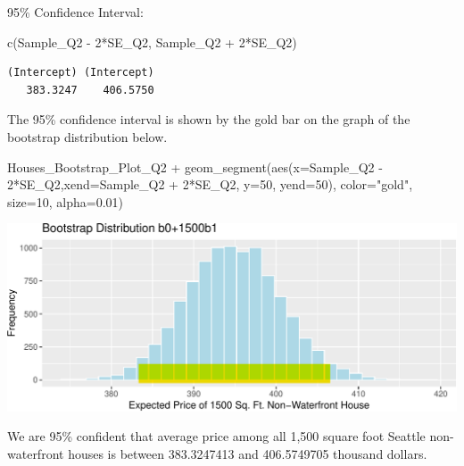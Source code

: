 \documentclass[
  letterpaper,
  DIV=11,
  numbers=noendperiod]{scrreprt}
\newenvironment{Shaded}{\begin{snugshade}}{\end{snugshade}}
\newcommand{\AttributeTok}[1]{\textcolor[rgb]{0.40,0.45,0.13}{#1}}
\newcommand{\DecValTok}[1]{\textcolor[rgb]{0.68,0.00,0.00}{#1}}
\newcommand{\FloatTok}[1]{\textcolor[rgb]{0.68,0.00,0.00}{#1}}
\newcommand{\FunctionTok}[1]{\textcolor[rgb]{0.28,0.35,0.67}{#1}}
\newcommand{\NormalTok}[1]{\textcolor[rgb]{0.00,0.23,0.31}{#1}}
\newcommand{\SpecialCharTok}[1]{\textcolor[rgb]{0.37,0.37,0.37}{#1}}
\newcommand{\StringTok}[1]{\textcolor[rgb]{0.13,0.47,0.30}{#1}}
\begin{document}
95\% Confidence Interval:

\begin{Shaded}
\begin{Highlighting}[]
\FunctionTok{c}\NormalTok{(Sample\_Q2 }\SpecialCharTok{{-}} \DecValTok{2}\SpecialCharTok{*}\NormalTok{SE\_Q2, Sample\_Q2 }\SpecialCharTok{+} \DecValTok{2}\SpecialCharTok{*}\NormalTok{SE\_Q2) }
\end{Highlighting}
\end{Shaded}

\begin{verbatim}
(Intercept) (Intercept) 
   383.3247    406.5750 
\end{verbatim}

The 95\% confidence interval is shown by the gold bar on the graph of
the bootstrap distribution below.

\begin{Shaded}
\begin{Highlighting}[]
\NormalTok{Houses\_Bootstrap\_Plot\_Q2 }\SpecialCharTok{+} 
  \FunctionTok{geom\_segment}\NormalTok{(}\FunctionTok{aes}\NormalTok{(}\AttributeTok{x=}\NormalTok{Sample\_Q2 }\SpecialCharTok{{-}} \DecValTok{2}\SpecialCharTok{*}\NormalTok{SE\_Q2,}\AttributeTok{xend=}\NormalTok{Sample\_Q2 }\SpecialCharTok{+} \DecValTok{2}\SpecialCharTok{*}\NormalTok{SE\_Q2, }\AttributeTok{y=}\DecValTok{50}\NormalTok{, }\AttributeTok{yend=}\DecValTok{50}\NormalTok{), }
               \AttributeTok{color=}\StringTok{"gold"}\NormalTok{, }\AttributeTok{size=}\DecValTok{10}\NormalTok{, }\AttributeTok{alpha=}\FloatTok{0.01}\NormalTok{) }
\end{Highlighting}
\end{Shaded}

\includegraphics{Ch3_files/figure-pdf/unnamed-chunk-167-1.pdf}

We are 95\% confident that average price among all 1,500 square foot
Seattle non-waterfront houses is between 383.3247413 and 406.5749705
thousand dollars.
\end{document}
